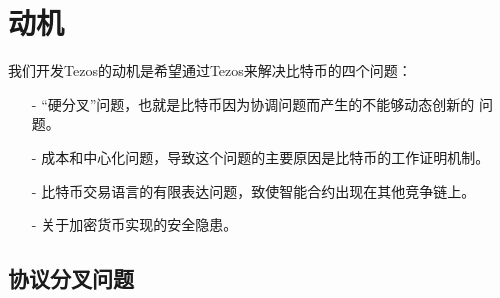\documentclass[letterpaper]{article}
\begin{document}
\section{动机}
我们开发Tezos的动机是希望通过Tezos来解决比特币\cite{Bitcoin}的四个问题：

\begin{itemize}
\item[-] ``硬分叉''问题，也就是比特币因为协调问题而产生的不能够动态创新的
  问题。
\item[-] 成本和中心化问题，导致这个问题的主要原因是比特币的工作证明机制。
\item[-] 比特币交易语言的有限表达问题，致使智能合约出现在其他竞争链上。
\item[-] 关于加密货币实现的安全隐患。
\end{itemize}

\subsection{协议分叉问题}

\end{document}
